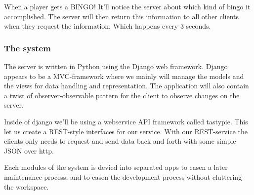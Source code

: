 When a player gets a BINGO! It'll notice the server about which kind of bingo it accomplished. The server will then return this information to all other clients when they request the information. Which happens every 3 seconds.

\subsubsection{The system}
The server is written in Python using the Django web framework. Django appears to be a MVC-framework where we mainly will manage the models and the views for data handling and representation. The application will also contain a twist of observer-observable pattern for the client to observe changes on the server.

Inside of django we'll be using a webservice API framework called tastypie. This let us create a REST-style interfaces for our service. With our REST-service the clients only needs to request and send data back and forth with some simple JSON over http.

Each modules of the system is devied into separated apps to easen a later maintenance process, and to easen the development process without cluttering the workspace.